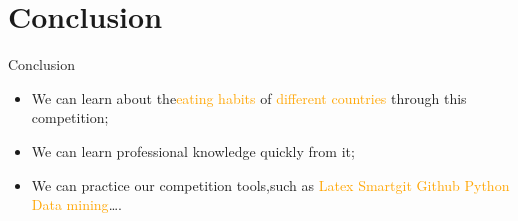 \documentclass[
 size=14pt,
 paper=smartboard,  %
 mode=present, 		%
 display=slides, 	%
 style=tuliplab,  	%
 pauseslide,
 fleqn,leqno]{powerdot}
\begin{document}
\section{Conclusion}
\begin{slide}[toc=,bm=]{Conclusion}
\begin{itemize}
\item
\smallskip
We can learn about the\textcolor{orange}{eating habits}
of \textcolor{orange}{different countries} through this competition;
\item
\smallskip
We can learn professional knowledge quickly from it;
\item
\smallskip
We can practice our competition tools,such as \textcolor{orange}{Latex Smartgit Github Python Data mining}\dots.
\end{itemize}




\end{slide}


%
\end{document}
